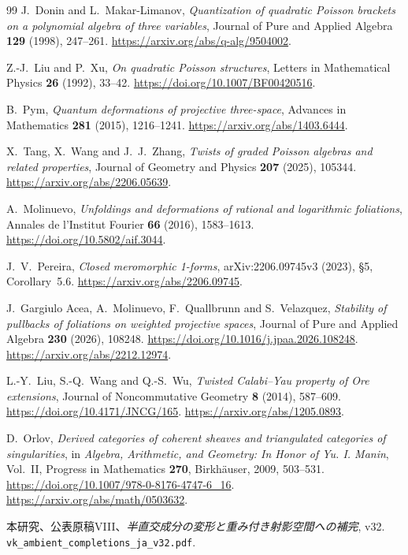 \begin{thebibliography}{99}
J.~Donin and L.~Makar-Limanov,
\emph{Quantization of quadratic Poisson brackets on a polynomial algebra of three variables},
Journal of Pure and Applied Algebra \textbf{129} (1998), 247--261.
\url{https://arxiv.org/abs/q-alg/9504002}.

Z.-J.~Liu and P.~Xu,
\emph{On quadratic Poisson structures},
Letters in Mathematical Physics \textbf{26} (1992), 33--42.
\url{https://doi.org/10.1007/BF00420516}.

B.~Pym,
\emph{Quantum deformations of projective three-space},
Advances in Mathematics \textbf{281} (2015), 1216--1241.
\url{https://arxiv.org/abs/1403.6444}.

X.~Tang, X.~Wang and J.~J.~Zhang,
\emph{Twists of graded Poisson algebras and related properties},
Journal of Geometry and Physics \textbf{207} (2025), 105344.
\url{https://arxiv.org/abs/2206.05639}.

A.~Molinuevo, \emph{Unfoldings and deformations of rational and logarithmic foliations},
Annales de l'Institut Fourier \textbf{66} (2016), 1583--1613.
\url{https://doi.org/10.5802/aif.3044}.

J.~V.~Pereira, \emph{Closed meromorphic 1-forms},
arXiv:2206.09745v3 (2023), \S5, Corollary~5.6.
\url{https://arxiv.org/abs/2206.09745}.

J.~Gargiulo Acea, A.~Molinuevo, F.~Quallbrunn and S.~Velazquez,
\emph{Stability of pullbacks of foliations on weighted projective spaces},
Journal of Pure and Applied Algebra \textbf{230} (2026), 108248.
\url{https://doi.org/10.1016/j.jpaa.2026.108248}.
\url{https://arxiv.org/abs/2212.12974}.

L.-Y.~Liu, S.-Q.~Wang and Q.-S.~Wu,
\emph{Twisted Calabi--Yau property of Ore extensions},
Journal of Noncommutative Geometry \textbf{8} (2014), 587--609.
\url{https://doi.org/10.4171/JNCG/165}.
\url{https://arxiv.org/abs/1205.0893}.

D.~Orlov, \emph{Derived categories of coherent sheaves and triangulated categories of singularities},
in \emph{Algebra, Arithmetic, and Geometry: In Honor of Yu. I. Manin}, Vol.~II,
Progress in Mathematics \textbf{270}, Birkh\"auser, 2009, 503--531.
\url{https://doi.org/10.1007/978-0-8176-4747-6_16}.
\url{https://arxiv.org/abs/math/0503632}.

本研究、公表原稿VIII、\emph{半直交成分の変形と重み付き射影空間への補完}, v32.
\nolinkurl{vk_ambient_completions_ja_v32.pdf}.


\end{thebibliography}

